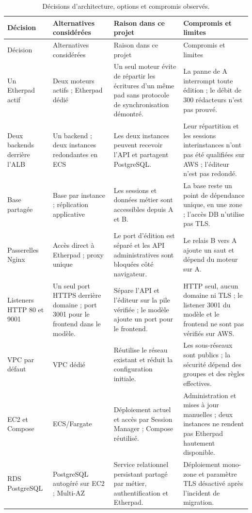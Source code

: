 \begin{longtable}{@{}L{26mm}L{30mm}L{45mm}L{40mm}@{}}
\caption{Décisions d'architecture, options et compromis observés.}\label{tab:decisions-architecture}\\
\toprule Décision & Alternatives considérées & Raison dans ce projet & Compromis et limites \\
\midrule\endfirsthead
\toprule Décision & Alternatives considérées & Raison dans ce projet & Compromis et limites \\
\midrule\endhead
Un Etherpad actif & Deux moteurs actifs ; Etherpad dédié & Un seul moteur évite de répartir les écritures d'un même pad sans protocole de synchronisation démontré. & La panne de A interrompt toute édition ; le débit de 300 rédacteurs n'est pas prouvé. \\
Deux backends derrière l'ALB & Un backend ; deux instances redondantes en ECS & Les deux instances peuvent recevoir l'API et partagent PostgreSQL. & Leur répartition et les sessions interinstances n'ont pas été qualifiées sur AWS ; l'éditeur n'est pas redondé. \\
Base partagée & Base par instance ; réplication applicative & Les sessions et données métier sont accessibles depuis A et B. & La base reste un point de dépendance unique, en une zone ; l'accès DB n'utilise pas TLS. \\
Passerelles Nginx & Accès direct à Etherpad ; proxy unique & Le port d'édition est séparé et les API administratives sont bloquées côté navigateur. & Le relais B vers A ajoute un saut et dépend du moteur sur A. \\
Listeners HTTP 80 et 9001 & Un seul port HTTPS derrière domaine ; port 3001 pour le frontend dans le modèle. & Sépare l'API et l'éditeur sur la pile vérifiée ; le modèle ajoute un port pour le frontend. & HTTP seul, aucun domaine ni TLS ; le listener 3001 du modèle et le frontend ne sont pas vérifiés sur AWS. \\
VPC par défaut & VPC dédié & Réutilise le réseau existant et réduit la configuration initiale. & Les sous-réseaux sont publics ; la sécurité dépend des groupes et des règles effectives. \\
EC2 et Compose & ECS/Fargate & Déploiement actuel et accès par Session Manager ; Compose réutilisé. & Administration et mises à jour manuelles ; deux instances ne rendent pas Etherpad hautement disponible. \\
RDS PostgreSQL & PostgreSQL autogéré sur EC2 ; Multi-AZ & Service relationnel persistant partagé par métier, authentification et Etherpad. & Déploiement mono-zone et paramètre TLS désactivé après l'incident de migration. \\

\end{longtable}
